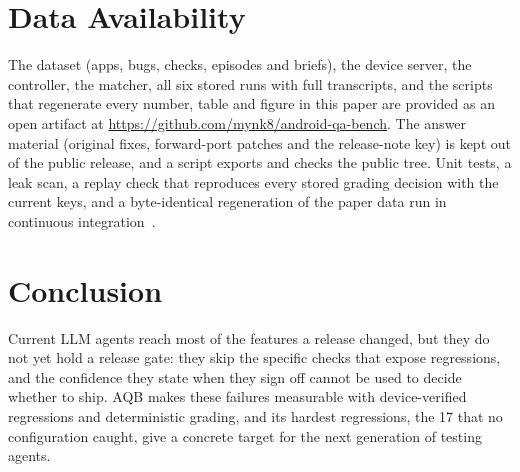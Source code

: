 \documentclass[sigconf]{acmart}
\newcommand{\aqb}{AQB\xspace}
\begin{document}
\section{Data Availability}
The dataset (apps, bugs, checks, episodes and briefs), the device server, the controller, the matcher,
all six stored runs with full transcripts, and the scripts that regenerate every number, table and
figure in this paper are provided as an open artifact at \url{https://github.com/mynk8/android-qa-bench}. The answer material (original
fixes, forward-port patches and the release-note key) is kept out of the public release, and a script
exports and checks the public tree. Unit tests, a leak scan, a replay check that reproduces every
stored grading decision with the current keys, and a byte-identical regeneration of the paper data run
in continuous integration~\cite{collberg2016repeatability}.

\section{Conclusion}
Current LLM agents reach most of the features a release changed, but they do not yet hold a release
gate: they skip the specific checks that expose regressions, and the confidence they state when they
sign off cannot be used to decide whether to ship. \aqb makes these failures measurable with
device-verified regressions and deterministic grading, and its hardest regressions, the 17 that no
configuration caught, give a concrete target for the next generation of testing agents.




\appendix
\end{document}
